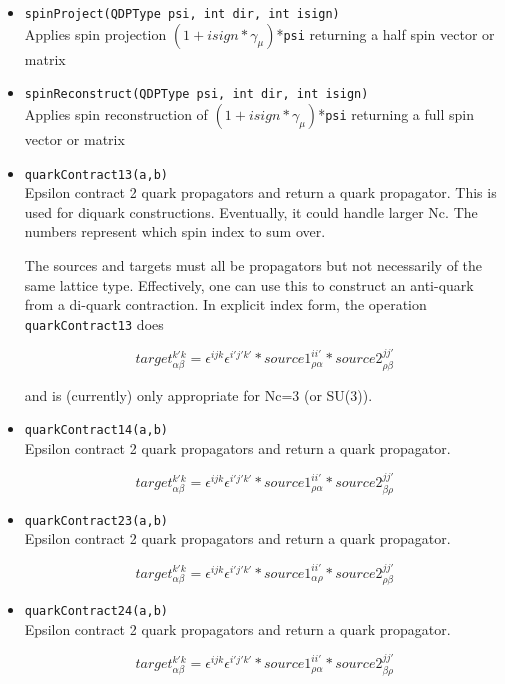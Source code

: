\documentclass[12pt,letterpaper]{article}
\begin{document}
\begin{itemize}
\item
\verb|spinProject(QDPType psi, int dir, int isign)|\\
Applies spin projection $(1 + isign*\gamma_\mu)$*\verb|psi|
returning a half spin vector or matrix

\item
\verb|spinReconstruct(QDPType psi, int dir, int isign)|\\
Applies spin reconstruction of $(1 + isign*\gamma_\mu)$*\verb|psi|
returning a full spin vector or matrix

\item
\verb|quarkContract13(a,b)|\\
Epsilon contract 2 quark propagators and return a quark propagator.
This is used for diquark constructions. Eventually, it could handle larger
Nc. 
The numbers represent which spin index to sum over.
   
The sources and targets must all be propagators but not
necessarily of the same lattice type. Effectively, one can use
this to construct an anti-quark from a di-quark contraction. In
explicit index form, the operation  \verb|quarkContract13| does

$$target^{k' k}_{\alpha\beta} =
 \epsilon^{i j k}\epsilon^{i' j' k'}* source1^{i i'}_{\rho\alpha}* source2^{j j'}_{\rho\beta}$$
   
and is (currently) only appropriate for Nc=3  (or SU(3)).

\item
\verb|quarkContract14(a,b)|\\
Epsilon contract 2 quark propagators and return a quark propagator.
   
$$target^{k' k}_{\alpha\beta} =
    \epsilon^{i j k}\epsilon^{i' j' k'}*source1^{i i'}_{\rho\alpha}*source2^{j j'}_{\beta\rho}$$

\item
\verb|quarkContract23(a,b)|\\
Epsilon contract 2 quark propagators and return a quark propagator.
   
$$target^{k' k}_{\alpha\beta} =
    \epsilon^{i j k}\epsilon^{i' j' k'}*source1^{i i'}_{\alpha\rho}*source2^{j j'}_{\rho\beta}$$

\item
\verb|quarkContract24(a,b)|\\
Epsilon contract 2 quark propagators and return a quark propagator.
   
$$target^{k' k}_{\alpha\beta} =
    \epsilon^{i j k}\epsilon^{i' j' k'}*source1^{i i'}_{\rho\alpha}*source2^{j j'}_{\beta\rho}$$


\end{itemize}
\end{document}
